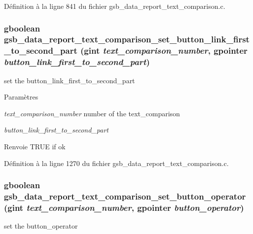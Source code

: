 Définition à la ligne 841 du fichier gsb\_\-data\_\-report\_\-text\_\-comparison.c.

\subsubsection[{gsb\_\-data\_\-report\_\-text\_\-comparison\_\-set\_\-button\_\-link\_\-first\_\-to\_\-second\_\-part}]{\setlength{\rightskip}{0pt plus 5cm}gboolean gsb\_\-data\_\-report\_\-text\_\-comparison\_\-set\_\-button\_\-link\_\-first\_\-to\_\-second\_\-part (gint {\em text\_\-comparison\_\-number}, \/  gpointer {\em button\_\-link\_\-first\_\-to\_\-second\_\-part})}\label{gsb__data__report__text__comparison_8c_afc607fa71339ca5587076a4ad8638f0d}
set the button\_\-link\_\-first\_\-to\_\-second\_\-part


\begin{DoxyParams}{Paramètres}
\item[{\em text\_\-comparison\_\-number}]number of the text\_\-comparison \item[{\em button\_\-link\_\-first\_\-to\_\-second\_\-part}]\end{DoxyParams}
\begin{DoxyReturn}{Renvoie}
TRUE if ok 
\end{DoxyReturn}


Définition à la ligne 1270 du fichier gsb\_\-data\_\-report\_\-text\_\-comparison.c.

\subsubsection[{gsb\_\-data\_\-report\_\-text\_\-comparison\_\-set\_\-button\_\-operator}]{\setlength{\rightskip}{0pt plus 5cm}gboolean gsb\_\-data\_\-report\_\-text\_\-comparison\_\-set\_\-button\_\-operator (gint {\em text\_\-comparison\_\-number}, \/  gpointer {\em button\_\-operator})}\label{gsb__data__report__text__comparison_8c_a19673b6f71dc4ee8f6348868e5224bf5}
set the button\_\-operator


